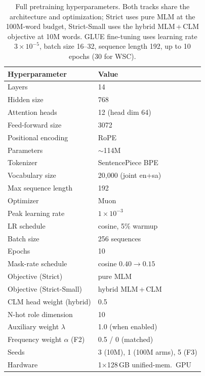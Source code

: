 \documentclass[11pt]{article}
\begin{document}
\begin{table}[t]
\centering\small
\caption{Full pretraining hyperparameters. Both tracks share the architecture and optimization; Strict uses pure MLM at the 100M-word budget, Strict-Small uses the hybrid MLM\,+\,CLM objective at 10M words. GLUE fine-tuning uses learning rate $3\times10^{-5}$, batch size 16--32, sequence length 192, up to 10 epochs (30 for WSC).}
\label{tab:hparams}
\begin{tabular}{ll}
\toprule
Hyperparameter & Value \\
\midrule
Layers & 14 \\
Hidden size & 768 \\
Attention heads & 12 (head dim 64) \\
Feed-forward size & 3072 \\
Positional encoding & RoPE \\
Parameters & $\sim$114M \\
\midrule
Tokenizer & SentencePiece BPE \\
Vocabulary size & 20{,}000 (joint en+sa) \\
Max sequence length & 192 \\
\midrule
Optimizer & Muon \\
Peak learning rate & $1\times10^{-3}$ \\
LR schedule & cosine, 5\% warmup \\
Batch size & 256 sequences \\
Epochs & 10 \\
Mask-rate schedule & cosine $0.40\!\to\!0.15$ \\
\midrule
Objective (Strict) & pure MLM \\
Objective (Strict-Small) & hybrid MLM\,+\,CLM \\
CLM head weight (hybrid) & 0.5 \\
N-hot role dimension & 10 \\
Auxiliary weight $\lambda$ & 1.0 (when enabled) \\
Frequency weight $\alpha$ (F2) & 0.5 / 0 (matched) \\
\midrule
Seeds & 3 (10M), 1 (100M arms), 5 (F3) \\
Hardware & 1$\times$128\,GB unified-mem.\ GPU \\
\bottomrule
\end{tabular}
\end{table}
\end{document}
